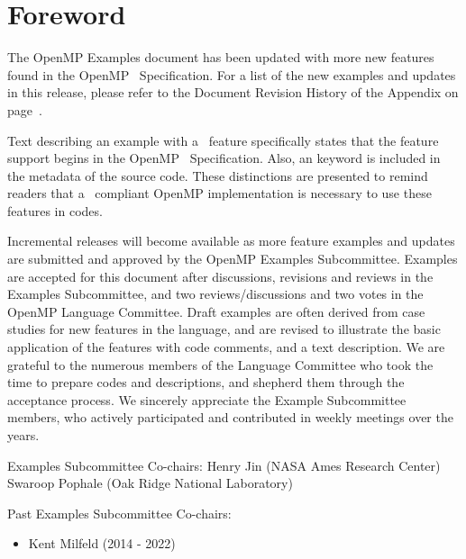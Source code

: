 \chapter*{Foreword}
\label{chap:foreword}

The OpenMP Examples document has been updated with more new features
found in the OpenMP \SVER\ Specification. 
For a list of the new examples and updates in this release,
please refer to the Document Revision History of the Appendix on page~\pageref{chap:history}.

Text describing an example with a \SVER\ feature specifically states
that the feature support begins in the OpenMP \SVER\ Specification.  Also,
an  keyword is included in the  metadata of the source code.
These distinctions are presented to remind readers that a \SVER\ compliant 
OpenMP implementation is necessary to use these features in codes.

Incremental releases will become available as more feature examples
and updates are submitted and approved by the OpenMP Examples Subcommittee.
Examples are accepted for this document after discussions, revisions and reviews
in the Examples Subcommittee, and two reviews/discussions and two votes
in the OpenMP Language Committee.
Draft examples are often derived from case studies for new features in the language,
and are revised to illustrate the basic application of the features with code comments,
and a text description. We are grateful to the numerous members of the Language Committee 
who took the time to prepare codes and descriptions, and shepherd them through
the acceptance process. We sincerely appreciate the Example Subcommittee members, who 
actively participated and contributed in weekly meetings over the years.

\bigskip
Examples Subcommittee Co-chairs: \smallskip\linebreak
Henry Jin (\textsc{NASA} Ames Research Center) \linebreak
Swaroop Pophale (Oak Ridge National Laboratory)

\bigskip
\bigskip
Past Examples Subcommittee Co-chairs:
\begin{itemize}
\item Kent Milfeld (2014 - 2022)
\end{itemize}


